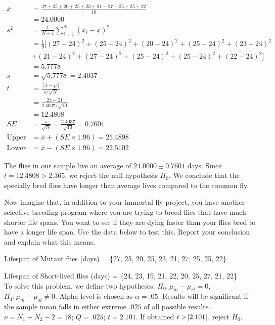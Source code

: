 \documentclass[onecolumn,10pt]{jhwhw}
\begin{document}
\begin{equation*}
\begin{split}
\overline{x} & = \frac{27 + 25 + 20 + 25 + 23 + 21 + 27 + 25 + 25 + 22}{10} \\
             & = 24.0000 \\
s^2 & = \frac{1}{N-1} \sum_{i=1}^N (x_i - \overline{x})^2 \\
    & = \frac{1}{9} [(27-24)^2 + (25-24)^2 + (20-24)^2 + (25-24)^2 + (23-24)^2 \\
    & + (21-24)^2 + (27-24)^2 + (25-24)^2 + (25-24)^2 + (22-24)^2] \\
    & = 5.7778 \\
s & = \sqrt{5.7778} = 2.4037\\
%
t & = \frac{\left[ \overline{x} - \mu \right]}{s/\sqrt{N}} \\
  & = \frac{24 - 21}{2.4037/\sqrt{10}} \\
  & = 12.4808\\
%
SE & = \frac{s}{\sqrt{N}} = \frac{2.4037}{\sqrt{10}} = 0.7601 \\
\text{Upper 95\%} & = \bar{x} + (SE \times 1.96) = 25.4898 \\
\text{Lower 95\%} & = \bar{x} - (SE \times 1.96) = 22.5102
\end{split}
\end{equation*}

The flies in our sample live an average of $24.0000 \pm 0.7601$ days. Since $t = 12.4808 > 2.365$, we reject the null hypothesis $H_0$. We conclude that the specially bred flies have longer than average lives compared to the common fly.

\problem{}
Now imagine that, in addition to your immortal fly project, you have another selective breeding program where you are trying to breed flies that have much shorter life spans. You want to see if they are dying faster than your flies bred to have a longer life span. Use the data below to test this. Report your conclusion and explain what this means.

Lifespan of Mutant flies (days) = \{27, 25, 20, 25, 23, 21, 27, 25, 25, 22\}

Lifespan of Short-lived flies (days) = \{24, 23, 19, 21, 22, 20, 25, 27, 21, 22\} \\

To solve this problem, we define two hypotheses: $H_0: \mu_{m} - \mu_{sl} = 0$, $H_1: \mu_{m} - \mu_{sl} \neq 0$. Alpha level is chosen as $\alpha = .05$. Results will be significant if the sample mean falls in either extreme $.025$ of all possible results. $\nu = N_1 + N_2 - 2 = 18$; $Q = .025$; $t = 2.101$. If obtained $t > \abs{2.101}$, reject $H_0$.
\end{document}
